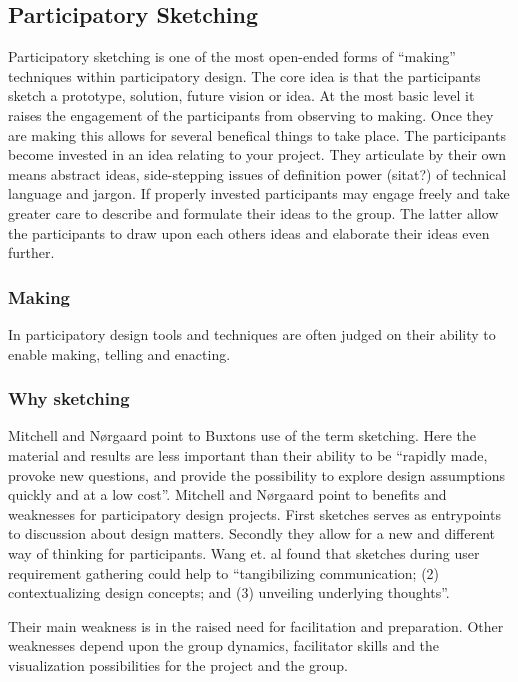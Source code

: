 \documentclass[11pt,UKenglish, a4paper]{article}
\begin{document}
\subsection{Participatory Sketching}
Participatory sketching is one of the most open-ended forms of ``making'' techniques within participatory design. 
The core idea is that the participants sketch a prototype, solution, future vision or idea. At the most basic level it raises the engagement of the participants from observing to making. Once they are making this allows for several benefical things to take place. The participants become invested in an idea relating to your project. They articulate by their own means abstract ideas, side-stepping issues of definition power (sitat?) of technical language and jargon. If properly invested participants may engage freely and take greater care to describe and formulate their ideas to the group. The latter allow the participants to draw upon each others ideas and elaborate their ideas even further.
\subsubsection*{Making}
In participatory design tools and techniques are often judged on their ability to enable making, telling and enacting\cite[husker ikke hvem, fiks kilde.]{Bannon2012Design}. 

\subsubsection*{Why sketching}
Mitchell and Nørgaard point to Buxtons use of the term sketching. Here the material and results are less important than their ability to be ``rapidly made, provoke new questions, and provide the possibility to explore design assumptions quickly and at a low cost''\cite[p.2]{Mitchell2011Using}. 
Mitchell and Nørgaard point to benefits and weaknesses for participatory design projects. First sketches serves as entrypoints to discussion about design matters. Secondly they allow for a new and different way of thinking for participants. Wang et. al found that sketches during user requirement gathering could help to ``tangibilizing communication; (2) contextualizing design concepts; and (3) unveiling underlying thoughts''\cite[p.9]{Wang2012User}. 

Their main weakness is in the raised need for facilitation and preparation. Other weaknesses depend upon the group dynamics, facilitator skills and the visualization possibilities for the project and the group. 
\end{document}
